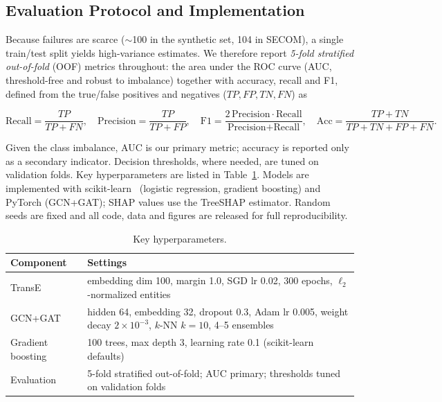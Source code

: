 \documentclass[electronics,article,submit,pdftex,moreauthors]{Definitions/mdpi}
\begin{document}
\subsection{Evaluation Protocol and Implementation}
Because failures are scarce ($\sim$100 in the synthetic set, 104 in SECOM), a single train/test split yields high-variance estimates. We therefore report \emph{5-fold stratified out-of-fold} (OOF) metrics throughout: the area under the ROC curve (AUC, threshold-free and robust to imbalance) together with accuracy, recall and F1, defined from the true/false positives and negatives ($TP,FP,TN,FN$) as

\begin{equation}
\text{Recall}=\frac{TP}{TP+FN},\quad
\text{Precision}=\frac{TP}{TP+FP},\quad
\text{F1}=\frac{2\,\text{Precision}\cdot\text{Recall}}{\text{Precision}+\text{Recall}},\quad
\text{Acc}=\frac{TP+TN}{TP+TN+FP+FN}.
\label{eq:metrics}
\end{equation}

Given the class imbalance, AUC is our primary metric; accuracy is reported only as a secondary indicator. Decision thresholds, where needed, are tuned on validation folds. Key hyperparameters are listed in Table~\ref{tab:hyper}. Models are implemented with scikit-learn~\cite{pedregosa2011scikit} (logistic regression, gradient boosting) and PyTorch (GCN+GAT); SHAP values use the TreeSHAP estimator. Random seeds are fixed and all code, data and figures are released for full reproducibility.

\begin{table}[H]
\caption{Key hyperparameters.}
\label{tab:hyper}
\begin{tabularx}{\textwidth}{lX}
\toprule
\textbf{Component} & \textbf{Settings}\\
\midrule
TransE & embedding dim 100, margin 1.0, SGD lr 0.02, 300 epochs, $\ell_2$-normalized entities\\
GCN+GAT & hidden 64, embedding 32, dropout 0.3, Adam lr 0.005, weight decay $2\times10^{-3}$, $k$-NN $k{=}10$, 4--5 ensembles\\
Gradient boosting & 100 trees, max depth 3, learning rate 0.1 (scikit-learn defaults)\\
Evaluation & 5-fold stratified out-of-fold; AUC primary; thresholds tuned on validation folds\\
\bottomrule
\end{tabularx}
\end{table}

\end{document}
